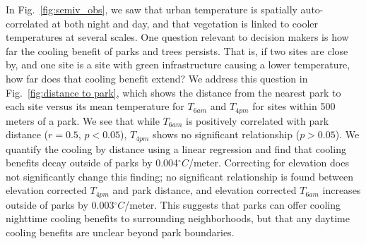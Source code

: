 \documentclass[draft,linenumbers]{agujournal}
\begin{document}
In Fig.~\ref{fig:semiv_obs}, we saw that urban temperature is spatially auto-correlated at both night and day, and that vegetation is linked to cooler temperatures at several scales. One question relevant to decision makers is how far the cooling benefit of parks and trees persists. That is, if two sites are close by, and one site is a site with green infrastructure causing a lower temperature, how far does that cooling benefit extend? 
We address this question in Fig.~\ref{fig:distance to park}, which shows the distance from the nearest park to each site versus its mean temperature for $T_{6am}$ and $T_{4pm}$ for sites within 500 meters of a park. We see that while $T_{6am}$ is positively correlated with park distance ($r=0.5$, $p< 0.05$), $T_{4pm}$ shows no significant relationship ($p>0.05$).  We quantify the cooling by distance using a linear regression and find that cooling benefits decay outside of parks by 0.004$^\circ C$/meter. 
Correcting for elevation does not significantly change this finding; no significant relationship is found between elevation corrected $T_{4pm}$ and park distance, and elevation corrected $T_{6am}$ increases outside of parks by 0.003$^\circ C$/meter.  This suggests that parks can offer cooling nighttime cooling benefits to surrounding neighborhoods, but that any daytime cooling benefits are unclear beyond park boundaries. 
\end{document}

